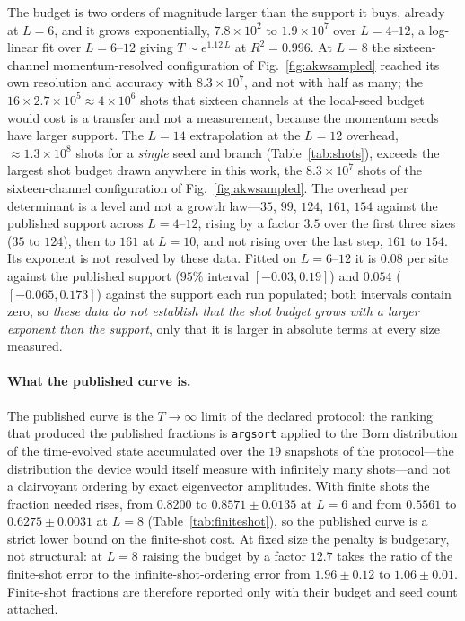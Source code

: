 The budget is two orders of magnitude larger than the support it buys, already at $L=6$, and it
grows exponentially, $7.8\times10^{2}$ to $1.9\times10^{7}$ over $L=4$--$12$, a log-linear fit over
$L=6$--$12$ giving $T\sim e^{1.12\,L}$ at $R^{2}=0.996$. At $L=8$ the sixteen-channel momentum-resolved
configuration of Fig.~\ref{fig:akwsampled} reached its own resolution and
accuracy with $8.3\times10^{7}$, and not with half as many; the $16\times2.7\times10^{5}\approx4\times10^{6}$
shots that sixteen channels at the local-seed budget would cost is a transfer and not a measurement,
because the momentum seeds have larger support. The $L=14$ extrapolation at the $L=12$ overhead,
${\approx}1.3\times10^{8}$ shots for a \emph{single} seed and branch (Table~\ref{tab:shots}), exceeds the
largest shot budget drawn anywhere
in this work, the $8.3\times10^{7}$ shots of the sixteen-channel configuration of
Fig.~\ref{fig:akwsampled}. The overhead per determinant is a level and not a growth law---$35$,
$99$, $124$, $161$, $154$ against the published support across $L=4$--$12$, rising by a factor $3.5$
over the first three sizes ($35$ to $124$), then to $161$ at $L=10$, and not rising over the last
step, $161$ to $154$. Its exponent is not resolved by these data. Fitted on $L=6$--$12$ it is $0.08$ per site against the published support ($95\%$ interval $[-0.03,0.19]$) and $0.054$ ($[-0.065,0.173]$) against the support each run populated; both intervals contain zero, so \emph{these data do not establish that the shot budget grows with a larger exponent than the
support}, only that it is larger in absolute terms at every size measured.

\paragraph{What the published curve is.} The published curve is the $T\to\infty$ limit of the
declared protocol: the ranking that produced the published fractions is \texttt{argsort} applied to
the Born distribution of the time-evolved state accumulated over the $19$ snapshots of the
protocol---the distribution the device would itself measure with infinitely many shots---and not a
clairvoyant ordering by exact eigenvector amplitudes. With
finite shots the fraction needed rises, from $0.8200$ to $0.8571\pm0.0135$ at $L=6$ and from $0.5561$ to
$0.6275\pm0.0031$ at $L=8$ (Table~\ref{tab:finiteshot}), so the published curve is a strict lower bound
on the finite-shot cost. At fixed size the penalty is budgetary, not structural: at $L=8$ raising the budget by a
factor $12.7$ takes the ratio of the finite-shot error to the infinite-shot-ordering error from
$1.96\pm0.12$ to $1.06\pm0.01$. Finite-shot fractions are therefore reported only with their budget and
seed count attached.

